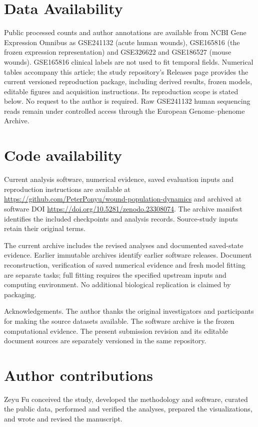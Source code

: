 \documentclass[10pt,a4paper]{article}
\begin{document}
\section*{Data Availability}
Public processed counts and author annotations are available from NCBI Gene Expression Omnibus as GSE241132 (acute human wounds), GSE165816 (the frozen expression representation) and GSE326622 and GSE186527 (mouse wounds). GSE165816 clinical labels are not used to fit temporal fields. Numerical tables accompany this article; the study repository's Releases page provides the current versioned reproduction package, including derived results, frozen models, editable figures and acquisition instructions. Its reproduction scope is stated below. No request to the author is required. Raw GSE241132 human sequencing reads remain under controlled access through the European Genome--phenome Archive.

\section*{Code availability}
Current analysis software, numerical evidence, saved evaluation inputs and reproduction instructions are available at \url{https://github.com/PeterPonyu/wound-population-dynamics} and archived at software DOI \url{https://doi.org/10.5281/zenodo.23308074}. The archive manifest identifies the included checkpoints and analysis records. Source-study inputs retain their original terms.

The current archive includes the revised analyses and documented saved-state evidence. Earlier immutable archives identify earlier software releases. Document reconstruction, verification of saved numerical evidence and fresh model fitting are separate tasks; full fitting requires the specified upstream inputs and computing environment. No additional biological replication is claimed by packaging.

Acknowledgements. The author thanks the original investigators and participants for making the source datasets available.
\FloatBarrier
The software archive is the frozen computational evidence. The present submission revision and its editable document sources are separately versioned in the same repository.




\section*{Author contributions}
Zeyu Fu conceived the study, developed the methodology and software, curated the public data, performed and verified the analyses, prepared the visualizations, and wrote and revised the manuscript.
\end{document}
